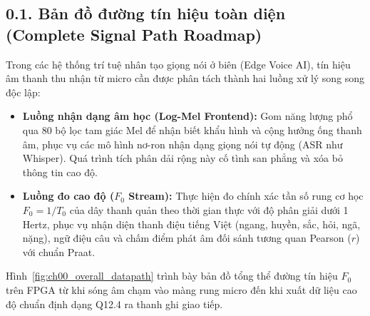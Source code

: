 \subsection*{0.1. Bản đồ đường tín hiệu toàn diện (Complete Signal Path Roadmap)}

Trong các hệ thống trí tuệ nhân tạo giọng nói ở biên (Edge Voice AI), tín hiệu âm thanh thu nhận từ micro cần được phân tách thành hai luồng xử lý song song độc lập:
\begin{itemize}[leftmargin=1.4em]
    \item \textbf{Luồng nhận dạng âm học (Log-Mel Frontend):} Gom năng lượng phổ qua 80 bộ lọc tam giác Mel để nhận biết khẩu hình và cộng hưởng ống thanh âm, phục vụ các mô hình nơ-ron nhận dạng giọng nói tự động (ASR như Whisper). Quá trình tích phân dải rộng này cố tình san phẳng và xóa bỏ thông tin cao độ.
    \item \textbf{Luồng đo cao độ ($F_0$ Stream):} Thực hiện đo chính xác tần số rung cơ học $F_0 = 1/T_0$ của dây thanh quản theo thời gian thực với độ phân giải dưới 1 Hertz, phục vụ nhận diện thanh điệu tiếng Việt (ngang, huyền, sắc, hỏi, ngã, nặng), ngữ điệu câu và chấm điểm phát âm đối sánh tương quan Pearson ($r$) với chuẩn Praat.
\end{itemize}

Hình~\ref{fig:ch00_overall_datapath} trình bày bản đồ tổng thể đường tín hiệu $F_0$ trên FPGA từ khi sóng âm chạm vào màng rung micro đến khi xuất dữ liệu cao độ chuẩn định dạng Q12.4 ra thanh ghi giao tiếp.


